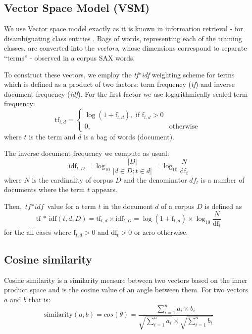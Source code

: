 \documentclass{llncs}
\begin{document}
\subsection{Vector Space Model (VSM)}
We use Vector space model exactly as it is known in information retrieval - for disambiguating class
entities \cite{salton}. Bags of words, representing each of the training classes, are converted into
the \textit{vectors}, whose dimensions correspond to separate “terms” - observed in a corpus SAX
words. 

To construct these vectors, we employ the \textit{tf$\ast$idf} weighting scheme for terms which is
defined as a product of two factors: term frequency (\textit{tf}) and inverse document frequency
(\textit{idf}). For the first factor we use logarithmically scaled term frequency:
\begin{equation}
 \mbox{tf}_{t, d} =  \begin{cases} \log(1 + \mbox{f}_{t,d}), \mbox{ if f}_{t,d}>0  \\
0, & \mbox{otherwise } \end{cases}
\end{equation} 
where $t$ is the term and $d$ is a bag of words (document).

The inverse document frequency we compute as usual:
\begin{equation}
 \mbox{idf}_{t, D} =  \log_{10}\frac{|D|}{|d \in D : t \in d|} = \log_{10}\frac{N}{\mbox{df}_{t}}
\end{equation} 
where $N$ is the cardinality of corpus $D$ and the denominator $df_{t}$ is a number of documents
where the term $t$ appears.

Then, $\textit{tf$\ast$idf}$ value for a term $t$ in the document $d$ of a corpus $D$ is defined as 
\begin{equation}
 \mbox{tf * idf}(t, d, D) =  \mbox{tf}_{t, d} \times \mbox{idf}_{t, D} = \log(1 + \mbox{f}_{t,d})
\times \log_{10}\frac{N}{\mbox{df}_{t}}
\end{equation} 
for the all cases where $\mbox{f}_{t,d}>0$ and $\mbox{df}_{t}>0$ or zero otherwise.

\subsection{Cosine similarity}
Cosine similarity is a similarity measure between two vectors based on the inner product space
and is the cosine value of an angle between them. For two vectors $a$ and $b$ that is:
\begin{equation}
 \mbox{similarity}(a,b) = cos(\theta) = \frac{ \sum\limits^{n}_{i=1} a_{i} \times b_{i} }{
\sqrt{\sum\limits^{n}_{i=1} a_{i}} \times \sqrt{\sum\limits^{n}_{i=1} b_{i}} }
\end{equation} 
\end{document}
